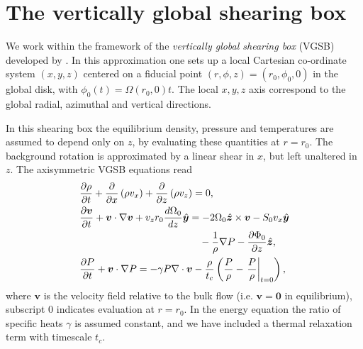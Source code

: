  
 
 \section{The vertically global shearing box} 
 We work within the framework of the \emph{vertically global shearing
   box} (VGSB) developed by \cite{mcnally14}. In this approximation
 one sets up a local Cartesian co-ordinate  system $(x,y,z)$ centered
 on a fiducial point $(r,\phi,z)=(r_0,\phi_0,0)$ in the global disk, with $\phi_0(t) =
 \Omega(r_0,0)t$. The local $x,y,z$ axis correspond to the
 global radial, azimuthal and vertical directions.  

 In this shearing box the equilibrium density, pressure and 
 temperatures are assumed to depend only on $z$, by evaluating these
 quantities at $r=r_0$. The background rotation is approximated by a
 linear shear in $x$, but left unaltered in $z$. 
 The axisymmetric VGSB equations read
 \begin{align}
   & \frac{\p\rho}{\p t} + \frac{\p}{\p x}\left(\rho v_x\right) +
   \frac{\p}{\p z}\left(\rho v_z\right)=0,\\
   & \frac{\p\bm{v}}{\p t} + \bm{v}\cdot\nabla\bm{v} +
   v_zr_0\frac{d\Omega_0}{dz} \hat{\bm{y}} = - 
   2\Omega_0\hat{\bm{z}}\times\bm{v} - S_0v_x\hat{\bm{y}} \notag\\ 
   &\phantom{\frac{\p\bm{v}}{\p t} + \bm{v}\cdot\nabla\bm{v} +
   v_zr_0\frac{d\Omega_0}{dz} \hat{\bm{y}}=}-\frac{1}{\rho}\nabla P - \frac{\p\Phi_0}{\p z}\hat{\bm{z}},\\
   & \frac{\p P}{\p t} + \bm{v}\cdot\nabla P = -\gamma P
   \nabla\cdot\bm{v} -
   \frac{\rho}{t_c}\left(\frac{P}{\rho}-\left.\frac{P}{\rho}\right|_{t=0}\right), 
 \end{align}
 where $\bm{v}$ is the velocity field relative to the bulk flow
 (i.e. $\bm{v}=\bm{0}$ in equilibrium),  
 subscript $0$ indicates evaluation at $r=r_0$. In the energy equation
 the ratio of specific heats $\gamma$ is assumed constant, 
 and we have included a thermal relaxation term with timescale $t_c$.  

